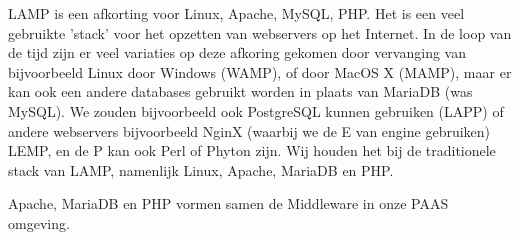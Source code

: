 LAMP is een afkorting voor Linux, Apache, MySQL, PHP. Het is een veel gebruikte 'stack' voor het opzetten van webservers op het Internet. In de loop van de tijd zijn er veel variaties op deze afkoring gekomen door vervanging van bijvoorbeeld Linux door Windows (WAMP), of door MacOS X (MAMP), maar er kan ook een andere databases gebruikt worden in plaats van MariaDB (was MySQL). We zouden bijvoorbeeld ook PostgreSQL kunnen gebruiken (LAPP) of andere webservers bijvoorbeeld NginX (waarbij we de E van engine gebruiken) LEMP, en de P kan ook Perl of Phyton zijn. Wij houden het bij de traditionele stack van LAMP, namenlijk Linux, Apache, MariaDB en PHP.

Apache, MariaDB en PHP vormen samen de Middleware in onze PAAS omgeving. 
